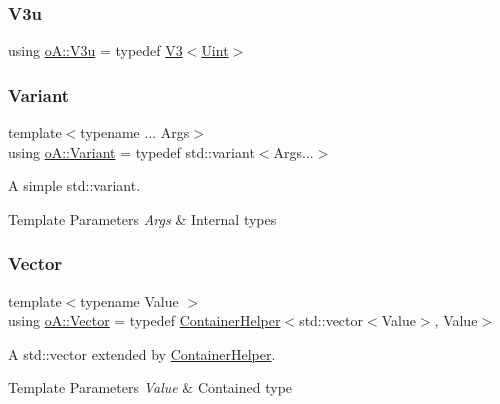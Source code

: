 \mbox{\label{namespaceo_a_ae91b6ba950b8f72e43ee17b69dbfeaad}} 
\subsubsection{\texorpdfstring{V3u}{V3u}}
{\footnotesize\ttfamily using \mbox{\hyperlink{namespaceo_a_ae91b6ba950b8f72e43ee17b69dbfeaad}{o\+A\+::\+V3u}} = typedef \mbox{\hyperlink{structo_a_1_1_v3}{V3}}$<$\mbox{\hyperlink{namespaceo_a_abe1d8250226c5cf34f84d7b75fc7922e}{Uint}}$>$}

\mbox{\label{namespaceo_a_a46a1498e4e673b19327a24fac0018867}} 
\subsubsection{\texorpdfstring{Variant}{Variant}}
{\footnotesize\ttfamily template$<$typename ... Args$>$ \\
using \mbox{\hyperlink{namespaceo_a_a46a1498e4e673b19327a24fac0018867}{o\+A\+::\+Variant}} = typedef std\+::variant$<$Args...$>$}



A simple std\+::variant. 


\begin{DoxyTemplParams}{Template Parameters}
{\em Args} & Internal types \\
\hline
\end{DoxyTemplParams}
\mbox{\label{namespaceo_a_a10997b8f468dc32c0a3e5e2ff56c57c1}} 
\subsubsection{\texorpdfstring{Vector}{Vector}}
{\footnotesize\ttfamily template$<$typename Value $>$ \\
using \mbox{\hyperlink{namespaceo_a_a10997b8f468dc32c0a3e5e2ff56c57c1}{o\+A\+::\+Vector}} = typedef \mbox{\hyperlink{classo_a_1_1_container_helper}{Container\+Helper}}$<$std\+::vector$<$Value$>$, Value$>$}



A std\+::vector extended by \mbox{\hyperlink{classo_a_1_1_container_helper}{Container\+Helper}}. 


\begin{DoxyTemplParams}{Template Parameters}
{\em Value} & Contained type \\
\hline
\end{DoxyTemplParams}


